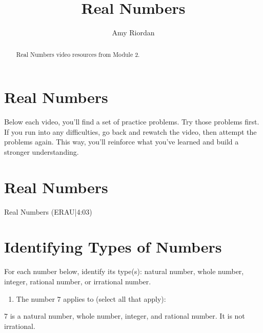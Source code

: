\documentclass{ximera}
\title{Real Numbers}
\author{Amy Riordan}
\begin{document}
\begin{abstract}
Real Numbers video resources from Module 2.
\end{abstract}
\maketitle

\section*{Real Numbers}

Below each video, you’ll find a set of practice problems. Try those problems first. If you run into any difficulties, go back and rewatch the video, then attempt the problems again. This way, you’ll reinforce what you’ve learned and build a stronger understanding.

\section*{Real Numbers}

Real Numbers (ERAU|4:03)


\section*{Identifying Types of Numbers}

For each number below, identify its type(s): natural number, whole number, integer, rational number, or irrational number.

\begin{problem}
\begin{enumerate}
\item The number $7$ applies to (select all that apply):
\begin{selectAll}
\end{selectAll}
\end{enumerate}

\begin{feedback}
$7$ is a natural number, whole number, integer, and rational number. It is not irrational.
\end{feedback}
\end{problem}
\end{document}
